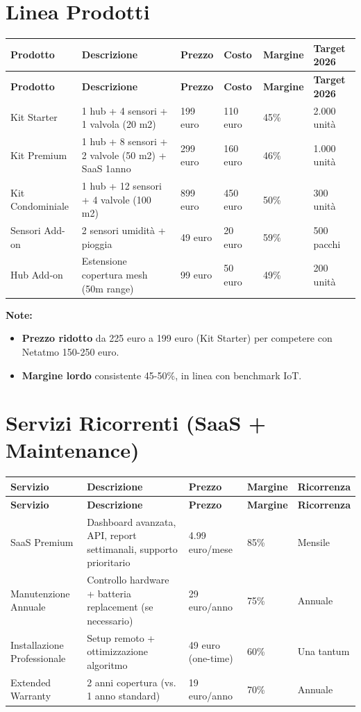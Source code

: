 \documentclass[11pt,a4paper]{report}
\begin{document}
\section{Linea Prodotti}
\begin{longtable}{|L{2.5cm}|L{3.5cm}|C{1.3cm}|C{1.3cm}|C{1.3cm}|L{1.8cm}|}
\hline
{\bf Prodotto} & {\bf Descrizione} & {\bf Prezzo} & {\bf Costo} & {\bf Margine} & {\bf Target 2026} \\ \hline
\endfirsthead
\hline
{\bf Prodotto} & {\bf Descrizione} & {\bf Prezzo} & {\bf Costo} & {\bf Margine} & {\bf Target 2026} \\ \hline
\endhead
\endfoot
\endlastfoot
Kit Starter & 1 hub + 4 sensori + 1 valvola (20 m2) & 199 euro & 110 euro & 45\% & 2.000 unità \\
Kit Premium & 1 hub + 8 sensori + 2 valvole (50 m2) + SaaS 1anno & 299 euro & 160 euro & 46\% & 1.000 unità \\
Kit Condominiale & 1 hub + 12 sensori + 4 valvole (100 m2) & 899 euro & 450 euro & 50\% & 300 unità \\
Sensori Add-on & 2 sensori umidità + pioggia & 49 euro & 20 euro & 59\% & 500 pacchi \\
Hub Add-on & Estensione copertura mesh (50m range) & 99 euro & 50 euro & 49\% & 200 unità \\ \hline
\end{longtable}

{\small \bf Note:}
\begin{itemize}
\item {\bf Prezzo ridotto} da 225 euro a 199 euro (Kit Starter) per competere con Netatmo 150-250 euro.
\item {\bf Margine lordo} consistente 45-50\%, in linea con benchmark IoT.
\end{itemize}

\section{Servizi Ricorrenti (SaaS + Maintenance)}
\begin{longtable}{|L{2.5cm}|L{3.5cm}|C{1.3cm}|C{1.3cm}|L{2cm}|}
\hline
{\bf Servizio} & {\bf Descrizione} & {\bf Prezzo} & {\bf Margine} & {\bf Ricorrenza} \\ \hline
\endfirsthead
\hline
{\bf Servizio} & {\bf Descrizione} & {\bf Prezzo} & {\bf Margine} & {\bf Ricorrenza} \\ \hline
\endhead
\endfoot
\endlastfoot
SaaS Premium & Dashboard avanzata, API, report settimanali, supporto prioritario & 4.99 euro/mese & 85\% & Mensile \\
Manutenzione Annuale & Controllo hardware + batteria replacement (se necessario) & 29 euro/anno & 75\% & Annuale \\
Installazione Professionale & Setup remoto + ottimizzazione algoritmo & 49 euro (one-time) & 60\% & Una tantum \\
Extended Warranty & 2 anni copertura (vs. 1 anno standard) & 19 euro/anno & 70\% & Annuale \\ \hline
\end{longtable}
\end{document}

